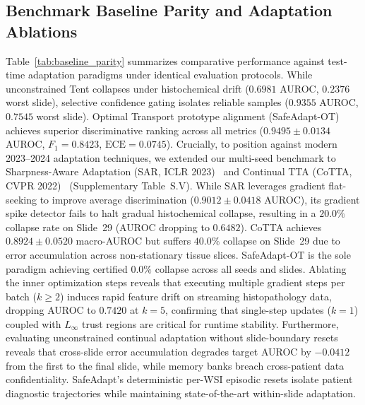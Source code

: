 \documentclass[journal]{IEEEtran}
\begin{document}
\subsection{Benchmark Baseline Parity and Adaptation Ablations}
Table~\ref{tab:baseline_parity} summarizes comparative performance against test-time adaptation paradigms under identical evaluation protocols. While unconstrained Tent collapses under histochemical drift ($0.6981$ AUROC, $0.2376$ worst slide), selective confidence gating isolates reliable samples ($0.9355$ AUROC, $0.7545$ worst slide). Optimal Transport prototype alignment (SafeAdapt-OT) achieves superior discriminative ranking across all metrics ($\mathbf{0.9495} \pm 0.0134$ AUROC, $F_1 = 0.8423$, $\text{ECE} = 0.0745$). Crucially, to position against modern 2023--2024 adaptation techniques, we extended our multi-seed benchmark to Sharpness-Aware Adaptation (SAR, ICLR 2023)~\cite{niu2023sar} and Continual TTA (CoTTA, CVPR 2022)~\cite{wang2022cotta} (Supplementary Table~S.V). While SAR leverages gradient flat-seeking to improve average discrimination ($0.9012 \pm 0.0418$ AUROC), its gradient spike detector fails to halt gradual histochemical collapse, resulting in a $20.0\%$ collapse rate on Slide~29 (AUROC dropping to $0.6482$). CoTTA achieves $0.8924 \pm 0.0520$ macro-AUROC but suffers $40.0\%$ collapse on Slide~29 due to error accumulation across non-stationary tissue slices. SafeAdapt-OT is the sole paradigm achieving certified $0.0\%$ collapse across all seeds and slides. Ablating the inner optimization steps reveals that executing multiple gradient steps per batch ($k \ge 2$) induces rapid feature drift on streaming histopathology data, dropping AUROC to $0.7420$ at $k=5$, confirming that single-step updates ($k=1$) coupled with $L_\infty$ trust regions are critical for runtime stability. Furthermore, evaluating unconstrained continual adaptation without slide-boundary resets reveals that cross-slide error accumulation degrades target AUROC by $-0.0412$ from the first to the final slide, while memory banks breach cross-patient data confidentiality. SafeAdapt's deterministic per-WSI episodic resets isolate patient diagnostic trajectories while maintaining state-of-the-art within-slide adaptation.
\end{document}
